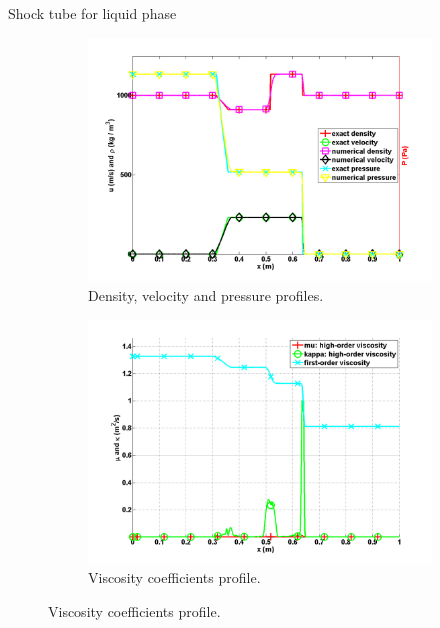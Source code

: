 \documentclass[xcolor=dvipsnames,10pt]{beamer}
\begin{document}
\begin{frame}{Shock tube for liquid phase}
\begin{figure}[H]
        \centering
        \begin{subfigure}[b]{0.5\textwidth}
                \centering
                \includegraphics[width=\textwidth]{../figures/LiquidSrongShock_density_velocity_pressure_profiles.png}
                \caption{Density, velocity and pressure profiles.}
        \end{subfigure}%
        \begin{subfigure}[b]{0.5\textwidth}
                \centering
                \includegraphics[width=\textwidth]{../figures/LiquidSrongShock_viscosity.png}
                \caption{Viscosity coefficients profile.}
        \end{subfigure}
\end{figure}
\end{frame}
\end{document}
